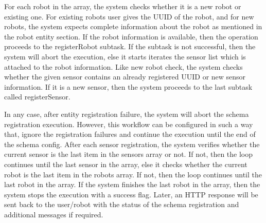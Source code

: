	For each robot in the array, the system checks whether it is a new robot or existing one. For existing robots user gives the UUID of the robot, and for new robots, the system expects complete information about the robot as mentioned in the robot entity section. If the robot information is available, then the operation proceeds to the registerRobot subtask. If the subtask is not successful, then the system will abort the execution, else it starts iterates the sensor list which is attached to the robot information. Like new robot check, the system checks whether the given sensor contains an already registered UUID or new sensor information. If it is a new sensor, then the system proceeds to the last subtask called registerSensor. 
	
	In any case, after entity registration failure, the system will abort the schema registration execution. However, this workflow can be configured in such a way that, ignore the registration failures and continue the execution until the end of the schema config. After each sensor registration, the system verifies whether the current sensor is the last item in the sensors array or not. If not, then the loop continues until the last sensor in the array, else it checks whether the current robot is the last item in the robots array. If not, then the loop continues until the last robot in the array.  If the system finishes the last robot in the array, then the system stops the execution with a success flag. Later, an HTTP response will be sent back to the user/robot with the status of the schema registration and additional messages if required.
	

